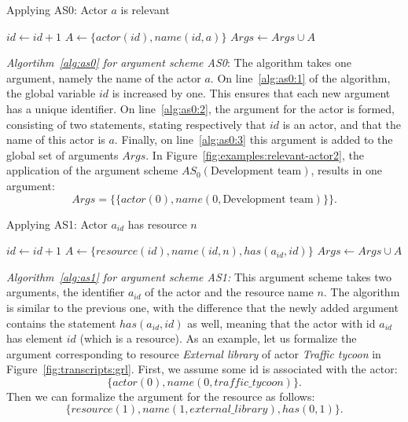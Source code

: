 \begin{algorithm}[h]
  \caption{Applying AS0: Actor $a$ is relevant}\label{alg:as0}
  \begin{algorithmic}[1]
    \State $id\gets id+1$\label{alg:as0:1}
    \State $A \gets \{actor(id), name(id,a)\}$\label{alg:as0:2}
    \State $Args \gets Args \cup A$\label{alg:as0:3}
    \EndProcedure
  \end{algorithmic}
\end{algorithm}

\emph{Algortihm~\ref{alg:as0} for argument scheme AS0}: The algorithm takes one argument, namely the name of the actor $a$. On line~\ref{alg:as0:1} of the algorithm, the global variable $id$ is increased by one. This ensures that each new argument has a unique identifier. On line~\ref{alg:as0:2}, the argument for the actor is formed, consisting of two statements, stating respectively that $id$ is an actor, and that the name of this actor is $a$. Finally, on line~\ref{alg:as0:3} this argument is added to the global set of arguments $Args$. In Figure~\ref{fig:examples:relevant-actor2}, the application of the argument scheme $AS_0(\text{Development team})$, results in one argument: $$Args = \{\{actor(0), name(0, \text{Development team})\}\}.$$

\begin{algorithm}[h]
  \caption{Applying AS1: Actor $a_{id}$ has resource $n$}\label{alg:as1}
  \begin{algorithmic}[1]
    \State $id\gets id+1$
    \State $A\gets \{resource(id), name(id,n), has(a_{id},id)\}$
    \State $Args \gets Args\cup A$
    \EndProcedure
  \end{algorithmic}
\end{algorithm}

\emph{Algorithm~\ref{alg:as1} for argument scheme AS1:} This argument scheme takes two arguments, the identifier $a_{id}$ of the actor and the resource name $n$. The algorithm is similar to the previous one, with the difference that the newly added argument contains the statement $has(a_{id},id)$ as well, meaning that the actor with id $a_{id}$ has element $id$ (which is a resource). As an example, let us formalize the argument corresponding to resource \emph{External library} of actor \emph{Traffic tycoon} in Figure~\ref{fig:transcripts:grl}. First, we assume some id is associated with the actor: $$\{actor(0),name(0,traffic\_tycoon)\}.$$ Then we can formalize the argument for the resource as follows: $$\{resource(1),name(1,external\_library),has(0,1)\}.$$

